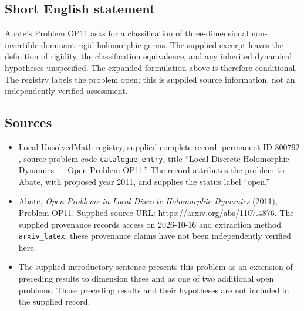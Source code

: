\documentclass[11pt]{article}
\begin{document}
\subsection{Short English statement}
Abate's Problem OP11 asks for a classification of three-dimensional non-invertible dominant rigid holomorphic germs. The supplied excerpt leaves the definition of rigidity, the classification equivalence, and any inherited dynamical hypotheses unspecified. The expanded formulation above is therefore conditional. The registry labels the problem open; this is supplied source information, not an independently verified assessment.
\subsection{Sources}
\begin{itemize}
\item Local UnsolvedMath registry, supplied complete record: permanent ID \(800792\), source problem code \texttt{catalogue entry}, title ``Local Discrete Holomorphic Dynamics --- Open Problem OP11.'' The record attributes the problem to Abate, with proposed year 2011, and supplies the status label ``open.''
\item Abate, \emph{Open Problems in Local Discrete Holomorphic Dynamics} (2011), Problem OP11. Supplied source URL: \url{https://arxiv.org/abs/1107.4876}. The supplied provenance records access on 2026-10-16 and extraction method \texttt{arxiv\_latex}; these provenance claims have not been independently verified here.
\item The supplied introductory sentence presents this problem as an extension of preceding results to dimension three and as one of two additional open problems. Those preceding results and their hypotheses are not included in the supplied record.
\end{itemize}
\end{document}
